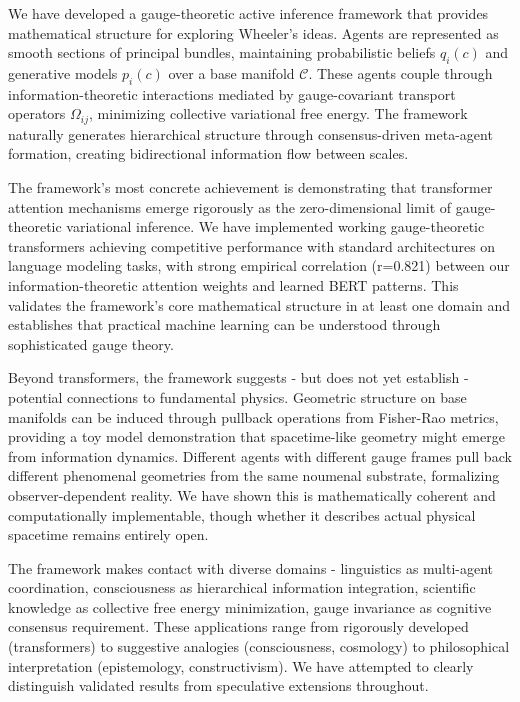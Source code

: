 \documentclass[11pt]{article}
\begin{document}
We have developed a gauge-theoretic active inference framework that provides mathematical structure for exploring Wheeler's ideas. Agents are represented as smooth sections of principal bundles, maintaining probabilistic beliefs $q_i(c)$ and generative models $p_i(c)$ over a base manifold $\mathcal{C}$. These agents couple through information-theoretic interactions mediated by gauge-covariant transport operators $\Omega_{ij}$, minimizing collective variational free energy. The framework naturally generates hierarchical structure through consensus-driven meta-agent formation, creating bidirectional information flow between scales.

The framework's most concrete achievement is demonstrating that transformer attention mechanisms emerge rigorously as the zero-dimensional limit of gauge-theoretic variational inference. We have implemented working gauge-theoretic transformers achieving competitive performance with standard architectures on language modeling tasks, with strong empirical correlation (r=0.821) between our information-theoretic attention weights and learned BERT patterns. This validates the framework's core mathematical structure in at least one domain and establishes that practical machine learning can be understood through sophisticated gauge theory.

Beyond transformers, the framework suggests - but does not yet establish - potential connections to fundamental physics. Geometric structure on base manifolds can be induced through pullback operations from Fisher-Rao metrics, providing a toy model demonstration that spacetime-like geometry might emerge from information dynamics. Different agents with different gauge frames pull back different phenomenal geometries from the same noumenal substrate, formalizing observer-dependent reality. We have shown this is mathematically coherent and computationally implementable, though whether it describes actual physical spacetime remains entirely open.

The framework makes contact with diverse domains - linguistics as multi-agent coordination, consciousness as hierarchical information integration, scientific knowledge as collective free energy minimization, gauge invariance as cognitive consensus requirement. These applications range from rigorously developed (transformers) to suggestive analogies (consciousness, cosmology) to philosophical interpretation (epistemology, constructivism). We have attempted to clearly distinguish validated results from speculative extensions throughout.
\end{document}
